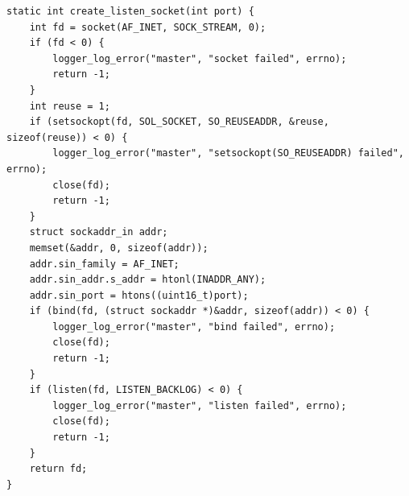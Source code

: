 \begin{lstlisting}[caption={Функция создания слушающего сокета}, label={lst:listen}]
static int create_listen_socket(int port) {
	int fd = socket(AF_INET, SOCK_STREAM, 0);
	if (fd < 0) {
		logger_log_error("master", "socket failed", errno);
		return -1;
	}
	int reuse = 1;
	if (setsockopt(fd, SOL_SOCKET, SO_REUSEADDR, &reuse, sizeof(reuse)) < 0) {
		logger_log_error("master", "setsockopt(SO_REUSEADDR) failed", errno);
		close(fd);
		return -1;
	}
	struct sockaddr_in addr;
	memset(&addr, 0, sizeof(addr));
	addr.sin_family = AF_INET;
	addr.sin_addr.s_addr = htonl(INADDR_ANY);
	addr.sin_port = htons((uint16_t)port);
	if (bind(fd, (struct sockaddr *)&addr, sizeof(addr)) < 0) {
		logger_log_error("master", "bind failed", errno);
		close(fd);
		return -1;
	}
	if (listen(fd, LISTEN_BACKLOG) < 0) {
		logger_log_error("master", "listen failed", errno);
		close(fd);
		return -1;
	}
	return fd;
}
\end{lstlisting}

